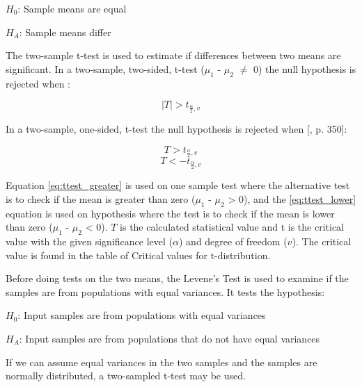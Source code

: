 \centerline{$H_{0}$: Sample means are equal} 
\centerline{$H_{A}$: Sample means differ}

The two-sample t-test is used to estimate if differences between two means are significant. In a two-sample, two-sided, t-test ($\mu_{1}$ - $\mu_{2}$ $\neq$ 0) the null hypothesis is rejected when \citep[p.~345]{Walpole2012}:

\begin{equation}
\label{eq:ttest_twoway}
|T| > t_{\frac{\alpha}{2}, v} 
\end{equation}

In a two-sample, one-sided, t-test the null hypothesis is rejected when [\citep{Walpole2012}, p. 350]:

\begin{equation}
\label{eq:ttest_greater}
T > t_{\frac{\alpha}{2}, v}
\end{equation}
\begin{equation}
\label{eq:ttest_lower}
T < - t_{\frac{\alpha}{2}, v}
\end{equation}

Equation \ref{eq:ttest_greater} is used on one sample test where the alternative test is to check if the mean is greater than zero ($\mu_{1}$ - $\mu_{2}$ > 0), and the \ref{eq:ttest_lower} equation is used on hypothesis where the test is to check if the mean is lower than zero ($\mu_{1}$ - $\mu_{2}$ < 0). $T$ is the calculated statistical value and t is the critical value with the given significance level ($\alpha$) and degree of freedom ($v$). The critical value is found in the table of Critical values for t-distribution. \newline 
 
Before doing tests on the two means, the Levene's Test is used to examine if the samples are from populations with equal variances. It tests the hypothesis:\newline %

\centerline{$H_{0}$: Input samples are from populations with equal variances} 
\centerline{$H_{A}$: Input samples are from populations that do not have equal variances}
\vspace{0.2cm}
If we can assume equal variances in the two samples and the samples are normally distributed, a two-sampled t-test may be used. 

